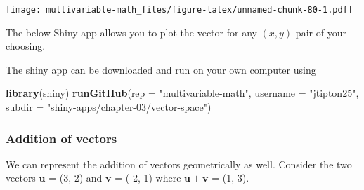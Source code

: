 \documentclass[
]{book}
\newenvironment{Shaded}{\begin{snugshade}}{\end{snugshade}}
\newcommand{\DataTypeTok}[1]{\textcolor[rgb]{0.13,0.29,0.53}{#1}}
\newcommand{\DecValTok}[1]{\textcolor[rgb]{0.00,0.00,0.81}{#1}}
\newcommand{\KeywordTok}[1]{\textcolor[rgb]{0.13,0.29,0.53}{\textbf{#1}}}
\newcommand{\NormalTok}[1]{#1}
\newcommand{\OperatorTok}[1]{\textcolor[rgb]{0.81,0.36,0.00}{\textbf{#1}}}
\newcommand{\StringTok}[1]{\textcolor[rgb]{0.31,0.60,0.02}{#1}}
\theoremstyle{definition}
\theoremstyle{definition}
\theoremstyle{definition}
\theoremstyle{remark}
\begin{document}
\texttt{[image: multivariable-math\_files/figure-latex/unnamed-chunk-80-1.pdf]}

The below Shiny app allows you to plot the vector for any \((x, y)\) pair of your choosing.

The shiny app can be downloaded and run on your own computer using

\begin{Shaded}
\begin{Highlighting}[]
\KeywordTok{library}\NormalTok{(shiny)}
\KeywordTok{runGitHub}\NormalTok{(}\DataTypeTok{rep =} \StringTok{"multivariable-math"}\NormalTok{, }\DataTypeTok{username =} \StringTok{"jtipton25"}\NormalTok{, }\DataTypeTok{subdir =} \StringTok{"shiny-apps/chapter-03/vector-space"}\NormalTok{) }
\end{Highlighting}
\end{Shaded}

\hypertarget{addition-of-vectors}{%
\subsubsection{Addition of vectors}\label{addition-of-vectors}}

We can represent the addition of vectors geometrically as well. Consider the two vectors \(\mathbf{u}\) = (3, 2) and \(\mathbf{v}\) = (-2, 1) where \(\mathbf{u} + \mathbf{v}\) = (1, 3).

\begin{Shaded}
\end{Shaded}
\end{document}

